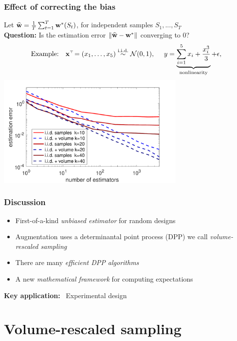\documentclass{beamer}
\begin{document}
\begin{frame}
  \frametitle{Effect of correcting the bias}
Let $\widehat{\mathbf w} = \frac1T\sum_{t=1}^T\mathbf w^*(S_t)$, for
  independent samples $S_1,...,S_T$\pause\\[1mm]
\textbf{Question:} Is the estimation error $\|\widehat{\mathbf w}-\mathbf w^*\|$ converging
to 0?\pause
\begin{align*}
\text{Example:}\quad \x^\top\! = (x_1,\dots,x_5)\overset{\text{i.i.d.}}{\sim} \Nc(0,1) ,\quad\ y =
    \underbrace{\sum_{i=1}^5 x_i + \frac{x_i^3}{3}}_{\text{nonlinearity}} +\epsilon,
\end{align*}
  \centering
  \includegraphics[width=0.7\textwidth]{../figs/gaussian}
\end{frame}


\begin{frame}
  \frametitle{Discussion}

  \begin{itemize}
  \item First-of-a-kind \emph{unbiased estimator} for random designs\\[4mm]
    \pause
  \item Augmentation uses a determinantal point process (DPP) we call \emph{volume-rescaled sampling}\\[4mm]
    \pause
  \item There are many \emph{efficient DPP algorithms} \hfill {}\\[4mm]
    \pause
  \item A new \emph{mathematical framework} for computing expectations
  \end{itemize}\pause\vspace{6mm}
  
  \textbf{Key application:} \ Experimental design
\end{frame}



\section{Volume-rescaled sampling}
\end{document}
